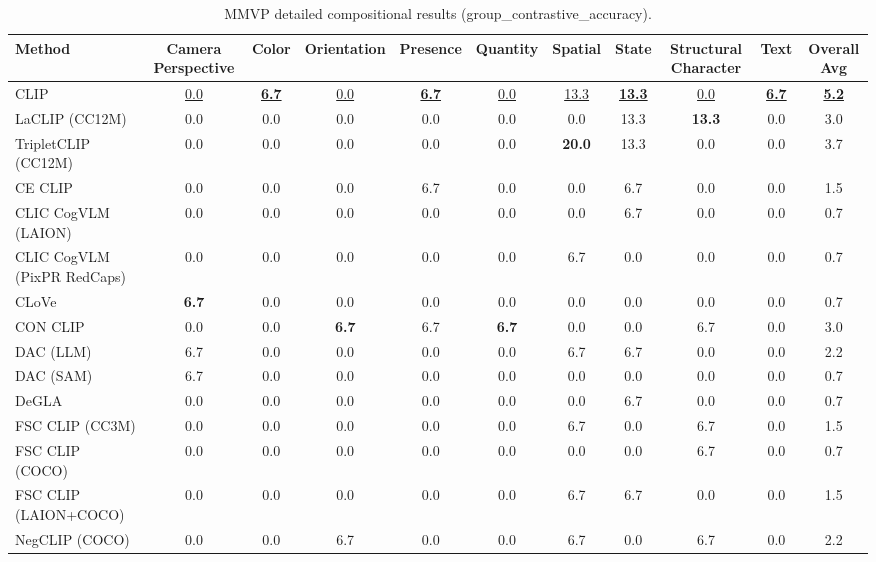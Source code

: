 \begin{table}[t]
  \centering
  \scriptsize
  \caption{MMVP detailed compositional results (group_contrastive_accuracy).}
  \label{tab:MMVP_detailed}
  \begin{adjustbox}{max width=\textwidth}
  \setlength{\tabcolsep}{2pt}
  \begin{tabular}{p{5cm}c|c|c|c|c|c|c|c|c|c}
    \toprule
    Method & Camera Perspective & Color & Orientation & Presence & Quantity & Spatial & State & Structural Character & Text & Overall Avg \\
    \midrule
    CLIP & \underline{0.0} & \underline{\textbf{6.7}} & \underline{0.0} & \underline{\textbf{6.7}} & \underline{0.0} & \underline{13.3} & \underline{\textbf{13.3}} & \underline{0.0} & \underline{\textbf{6.7}} & \underline{\textbf{5.2}} \\
    \midrule
    LaCLIP (CC12M) & 0.0 & 0.0 & 0.0 & 0.0 & 0.0 & 0.0 & 13.3 & \textbf{13.3} & 0.0 & 3.0 \\
    TripletCLIP (CC12M) & 0.0 & 0.0 & 0.0 & 0.0 & 0.0 & \textbf{20.0} & 13.3 & 0.0 & 0.0 & 3.7 \\
    \midrule
    CE CLIP & 0.0 & 0.0 & 0.0 & 6.7 & 0.0 & 0.0 & 6.7 & 0.0 & 0.0 & 1.5 \\
    CLIC CogVLM (LAION) & 0.0 & 0.0 & 0.0 & 0.0 & 0.0 & 0.0 & 6.7 & 0.0 & 0.0 & 0.7 \\
    CLIC CogVLM (PixPR RedCaps) & 0.0 & 0.0 & 0.0 & 0.0 & 0.0 & 6.7 & 0.0 & 0.0 & 0.0 & 0.7 \\
    CLoVe & \textbf{6.7} & 0.0 & 0.0 & 0.0 & 0.0 & 0.0 & 0.0 & 0.0 & 0.0 & 0.7 \\
    CON CLIP & 0.0 & 0.0 & \textbf{6.7} & 6.7 & \textbf{6.7} & 0.0 & 0.0 & 6.7 & 0.0 & 3.0 \\
    DAC (LLM) & 6.7 & 0.0 & 0.0 & 0.0 & 0.0 & 6.7 & 6.7 & 0.0 & 0.0 & 2.2 \\
    DAC (SAM) & 6.7 & 0.0 & 0.0 & 0.0 & 0.0 & 0.0 & 0.0 & 0.0 & 0.0 & 0.7 \\
    DeGLA & 0.0 & 0.0 & 0.0 & 0.0 & 0.0 & 0.0 & 6.7 & 0.0 & 0.0 & 0.7 \\
    FSC CLIP (CC3M) & 0.0 & 0.0 & 0.0 & 0.0 & 0.0 & 6.7 & 0.0 & 6.7 & 0.0 & 1.5 \\
    FSC CLIP (COCO) & 0.0 & 0.0 & 0.0 & 0.0 & 0.0 & 0.0 & 0.0 & 6.7 & 0.0 & 0.7 \\
    FSC CLIP (LAION+COCO) & 0.0 & 0.0 & 0.0 & 0.0 & 0.0 & 6.7 & 6.7 & 0.0 & 0.0 & 1.5 \\
    NegCLIP (COCO) & 0.0 & 0.0 & 6.7 & 0.0 & 0.0 & 6.7 & 0.0 & 6.7 & 0.0 & 2.2 \\

\end{tabular}
\end{adjustbox}
\end{table}

